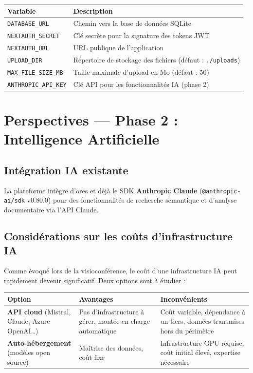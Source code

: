 \documentclass[a4paper,12pt,french]{article}
\begin{document}
\begin{tabularx}{\textwidth}{l X}
\toprule
\textbf{Variable} & \textbf{Description} \\
\midrule
\texttt{DATABASE\_URL} & Chemin vers la base de données SQLite \\
\texttt{NEXTAUTH\_SECRET} & Clé secrète pour la signature des tokens JWT \\
\texttt{NEXTAUTH\_URL} & URL publique de l'application \\
\texttt{UPLOAD\_DIR} & Répertoire de stockage des fichiers (défaut : \texttt{./uploads}) \\
\texttt{MAX\_FILE\_SIZE\_MB} & Taille maximale d'upload en Mo (défaut : 50) \\
\texttt{ANTHROPIC\_API\_KEY} & Clé API pour les fonctionnalités IA (phase 2) \\
\bottomrule
\end{tabularx}


\section{Perspectives — Phase 2 : Intelligence Artificielle}

\subsection{Intégration IA existante}

La plateforme intègre d'ores et déjà le SDK \textbf{Anthropic Claude} (\texttt{@anthropic-ai/sdk} v0.80.0) pour des fonctionnalités de recherche sémantique et d'analyse documentaire via l'API Claude.

\subsection{Considérations sur les coûts d'infrastructure IA}

Comme évoqué lors de la visioconférence, le coût d'une infrastructure IA peut rapidement devenir significatif. Deux options sont à étudier :

\begin{tabularx}{\textwidth}{l X X}
\toprule
\textbf{Option} & \textbf{Avantages} & \textbf{Inconvénients} \\
\midrule
\textbf{API cloud} (Mistral, Claude, Azure OpenAI…) & Pas d'infrastructure à gérer, montée en charge automatique & Coût variable, dépendance à un tiers, données transmises hors du périmètre \\
\addlinespace
\textbf{Auto-hébergement} (modèles open source) & Maîtrise des données, coût fixe & Infrastructure GPU requise, coût initial élevé, expertise nécessaire \\
\bottomrule
\end{tabularx}
\end{document}
